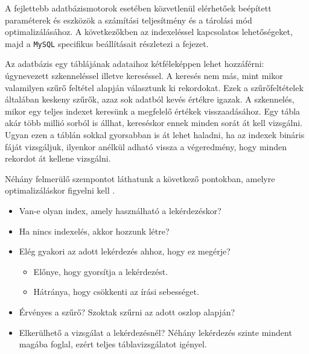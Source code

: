 

A fejlettebb adatbázismotorok esetében közvetlenül elérhetőek beépített paraméterek és eszközök a számítási teljesítmény és a tárolási mód optimalizálásához. A következőkben az indexeléssel kapcsolatos lehetőségeket, majd a \texttt{MySQL} specifikus beállításait részletezi a fejezet.


Az adatbázis egy táblájának adataihoz kétféleképpen lehet hozzáférni: úgynevezett szkenneléssel illetve kereséssel. A keresés nem más, mint mikor valamilyen szűrő feltétel alapján választunk ki rekordokat. Ezek a szűrőfeltételek általában keskeny szűrők, azaz sok adatból kevés értékre igazak. A szkennelés, mikor egy teljes indexet keresünk a megfelelő értékek visszaadásához. Egy tábla akár több millió sorból is állhat, kereséskor ennek minden sorát át kell vizsgálni. Ugyan ezen a táblán sokkal gyorsabban is át lehet haladni, ha az indexek bináris fáját vizsgáljuk, ilyenkor anélkül adható vissza a végeredmény, hogy minden rekordot át kellene vizsgálni.

Néhány felmerülő szempontot láthatunk a következő pontokban, amelyre optimalizáláskor figyelni kell \cite{manolopoulos2012advanced}.
\begin{itemize}
\item Van-e olyan index, amely használható a lekérdezéskor?
\item Ha nincs indexelés, akkor hozzunk létre?
\item Elég gyakori az adott lekérdezés ahhoz, hogy ez megérje?
\begin{itemize}
\item Előnye, hogy gyorsítja a lekérdezést.
\item Hátránya, hogy csökkenti az írási sebességet.
\end{itemize}
\item Érvényes a szűrő? Szoktak szűrni az adott oszlop alapján?
\item Elkerülhető a vizsgálat a lekérdezésnél? Néhány lekérdezés szinte mindent magába foglal, ezért teljes táblavizsgálatot igényel.
\end{itemize}



